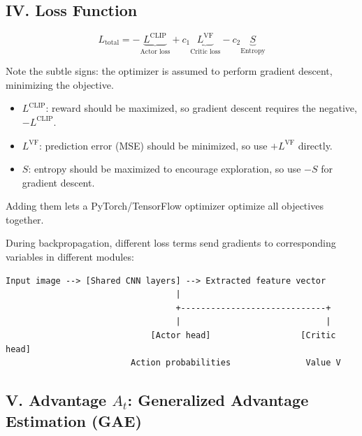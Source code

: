 \hypertarget{iv.-loss-function}{%
\subsection{IV. Loss Function}\label{iv.-loss-function}}

\[
L_{\mathrm{total}}=-\underbrace{L^{\mathrm{CLIP}}}_{\text{Actor loss}}+c_1\underbrace{L^{\mathrm{VF}}}_{\text{Critic loss}}-c_2\underbrace{S}_{\text{Entropy}}
\]

Note the subtle signs: the optimizer is assumed to perform gradient descent, minimizing the objective.

\begin{itemize}
\tightlist
\item
  \(L^{\mathrm{CLIP}}\): reward should be maximized, so gradient descent requires the negative, \(-L^{\mathrm{CLIP}}\).
\item
  \(L^{\mathrm{VF}}\): prediction error (MSE) should be minimized, so use \(+L^{\mathrm{VF}}\) directly.
\item
  \(S\): entropy should be maximized to encourage exploration, so use \(-S\) for gradient descent.
\end{itemize}

Adding them lets a PyTorch/TensorFlow optimizer optimize all objectives together.

During backpropagation, different loss terms send gradients to corresponding variables in different modules:

\begin{verbatim}
Input image --> [Shared CNN layers] --> Extracted feature vector
                                  |
                                  +-----------------------------+
                                  |                             |
                             [Actor head]                  [Critic head]
                         Action probabilities               Value V
\end{verbatim}

\hypertarget{v.-advantage-a_t-generalized-advantage-estimation-gae}{%
\subsection{\texorpdfstring{V. Advantage \(A_t\): Generalized Advantage Estimation (GAE)}{V. Advantage A\_t: Generalized Advantage Estimation (GAE)}}\label{v.-advantage-a_t-generalized-advantage-estimation-gae}}

